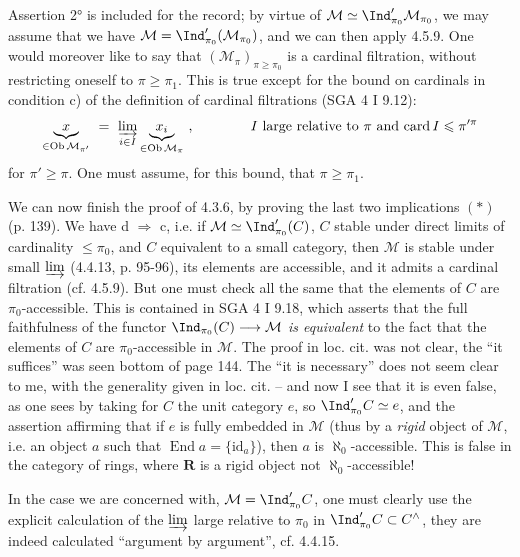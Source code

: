 Assertion 2° is included for the record; by virtue of $\mathcal{M}\simeq\Ind'_{\pi_0}\mathcal{M}_{\pi_0}$, we may assume that we have $\mathcal{M}=\Ind'_{\pi_0}(\mathcal{M}_{\pi_0})$, and we can then apply 4.5.9. One would moreover like to say that $(\mathcal{M}_\pi)_{\pi\geqslant\pi_0}$ is a cardinal filtration, without restricting oneself to $\pi\geqslant\pi_1$. This is true except for the bound on cardinals in condition c) of the definition of cardinal filtrations (SGA 4 I 9.12):
\[
\underbrace{x}_{\in\operatorname{Ob}\mathcal{M}_{\pi'}} \ =\ \varinjlim_{i\in I}\underbrace{x_i}_{\in\operatorname{Ob}\mathcal{M}_{\pi}}\ , \qquad\qquad \text{$I$ large relative to $\pi$ and $\operatorname{card}I\leqslant\pi'^{\pi}$}
\]
for $\pi'\geqslant\pi$. One must assume, for this bound, that $\pi\geqslant\pi_1$.


We can now finish the proof of 4.3.6, by proving the last two implications $(*)$ (p. 139). We have d $\Longrightarrow$ c, i.e. if $\mathcal{M}\simeq\Ind'_{\pi_0}(C)$, $C$ stable under direct limits of cardinality $\leqslant\pi_0$, and $C$ equivalent to a small category, then $\mathcal{M}$ is stable under small $\varinjlim$ (4.4.13, p. 95-96), its elements are accessible, and it admits a cardinal filtration (cf. 4.5.9). But one must check all the same that the elements of $C$ are $\pi_0$-accessible. This is contained in SGA 4 I 9.18, which asserts that the full faithfulness of the functor $\Ind_{\pi_0}(C)\longrightarrow\mathcal{M}$ \textit{is equivalent} to the fact that the elements of $C$ are $\pi_0$-accessible in $\mathcal{M}$. The proof in loc. cit. was not clear, the ``it suffices'' was seen bottom of page 144. The ``it is necessary'' does not seem clear to me, with the generality given in loc. cit. – and now I see that it is even false, as one sees by taking for $C$ the unit category $e$, so $\Ind'_{\pi_0}C\simeq e$, and the assertion affirming that if $e$ is fully embedded in $\mathcal{M}$ (thus by a \textit{rigid} object of $\mathcal{M}$, i.e. an object $a$ such that $\operatorname{End}a=\{\mathrm{id}_a\}$), then $a$ is $\aleph_0$-accessible. This is false in the category of rings, where $\mathbf{R}$ is a rigid object not $\aleph_0$-accessible!


In the case we are concerned with, $\mathcal{M}=\Ind'_{\pi_0}C$, one must clearly use the explicit calculation of the $\varinjlim$ large relative to $\pi_0$ in $\Ind'_{\pi_0}C\subset C^{\wedge}$, they are indeed calculated ``argument by argument'', cf. 4.4.15.

